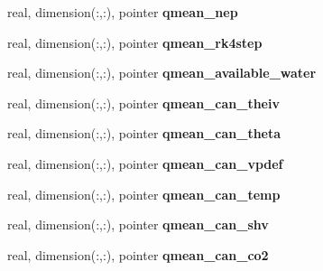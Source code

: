 \begin{DoxyCompactItemize}
\item 
\hypertarget{structed__state__vars_1_1edtype_a9c44d755a13ef6a58e5769c5d719bf5c}{
real, dimension(:,:), pointer {\bfseries qmean\_\-nep}}
\label{structed__state__vars_1_1edtype_a9c44d755a13ef6a58e5769c5d719bf5c}

\item 
\hypertarget{structed__state__vars_1_1edtype_aef2fa4a731475e05ce8e05dd6e33f572}{
real, dimension(:,:), pointer {\bfseries qmean\_\-rk4step}}
\label{structed__state__vars_1_1edtype_aef2fa4a731475e05ce8e05dd6e33f572}

\item 
\hypertarget{structed__state__vars_1_1edtype_aae0031e5fcd7dc588d9b356153626abb}{
real, dimension(:,:), pointer {\bfseries qmean\_\-available\_\-water}}
\label{structed__state__vars_1_1edtype_aae0031e5fcd7dc588d9b356153626abb}

\item 
\hypertarget{structed__state__vars_1_1edtype_a6d77f480c359f81957782f0d8c6fb96d}{
real, dimension(:,:), pointer {\bfseries qmean\_\-can\_\-theiv}}
\label{structed__state__vars_1_1edtype_a6d77f480c359f81957782f0d8c6fb96d}

\item 
\hypertarget{structed__state__vars_1_1edtype_a056dd72f942f7362e88c0a9014b4ae8d}{
real, dimension(:,:), pointer {\bfseries qmean\_\-can\_\-theta}}
\label{structed__state__vars_1_1edtype_a056dd72f942f7362e88c0a9014b4ae8d}

\item 
\hypertarget{structed__state__vars_1_1edtype_ac7885f57bf0c89733b825ebe3be241bb}{
real, dimension(:,:), pointer {\bfseries qmean\_\-can\_\-vpdef}}
\label{structed__state__vars_1_1edtype_ac7885f57bf0c89733b825ebe3be241bb}

\item 
\hypertarget{structed__state__vars_1_1edtype_a8b2012173deb948cc3533ad267d22057}{
real, dimension(:,:), pointer {\bfseries qmean\_\-can\_\-temp}}
\label{structed__state__vars_1_1edtype_a8b2012173deb948cc3533ad267d22057}

\item 
\hypertarget{structed__state__vars_1_1edtype_ad791c99714d82c22d77820dc4b94b04e}{
real, dimension(:,:), pointer {\bfseries qmean\_\-can\_\-shv}}
\label{structed__state__vars_1_1edtype_ad791c99714d82c22d77820dc4b94b04e}

\item 
\hypertarget{structed__state__vars_1_1edtype_a5ecd735791e794c368c35357bbba16e8}{
real, dimension(:,:), pointer {\bfseries qmean\_\-can\_\-co2}}
\label{structed__state__vars_1_1edtype_a5ecd735791e794c368c35357bbba16e8}


\end{DoxyCompactItemize}

